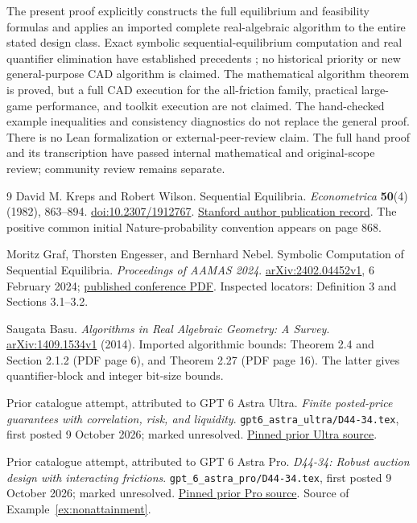 \documentclass[11pt,a4paper]{article}
\numberwithin{equation}{section}
\theoremstyle{definition}
\begin{document}
The present proof explicitly constructs the full equilibrium and
feasibility formulas and applies an imported complete real-algebraic
algorithm to the entire stated design class.
Exact symbolic sequential-equilibrium computation and real quantifier
elimination have established precedents
\cite{KW1982,GEN2024,Basu2014}; no historical priority or new
general-purpose CAD algorithm is claimed.
The mathematical algorithm theorem is proved, but a full CAD execution
for the all-friction family, practical large-game performance, and
toolkit execution are not claimed.
The hand-checked example inequalities and consistency diagnostics do
not replace the general proof.
There is no Lean formalization or external-peer-review claim.
The full hand proof and its transcription have passed internal mathematical
and original-scope review; community review remains separate.

\begin{thebibliography}{9}
David M. Kreps and Robert Wilson.
\newblock Sequential Equilibria.
\newblock \emph{Econometrica} \textbf{50}(4) (1982), 863--894.
\newblock \href{https://doi.org/10.2307/1912767}{doi:10.2307/1912767}.
\newblock \href{https://www.gsb.stanford.edu/faculty-research/publications/sequential-equilibrium}
{Stanford author publication record}.
\newblock The positive common initial Nature-probability convention
appears on page 868.

Moritz Graf, Thorsten Engesser, and Bernhard Nebel.
\newblock Symbolic Computation of Sequential Equilibria.
\newblock \emph{Proceedings of AAMAS 2024}.
\newblock \href{https://arxiv.org/html/2402.04452v1}
{arXiv:2402.04452v1}, 6 February 2024;
\href{https://www.ifaamas.org/Proceedings/aamas2024/pdfs/p715.pdf}
{published conference PDF}.
\newblock Inspected locators: Definition 3 and Sections 3.1--3.2.

Saugata Basu.
\newblock \emph{Algorithms in Real Algebraic Geometry: A Survey}.
\newblock \href{https://arxiv.org/pdf/1409.1534v1}
{arXiv:1409.1534v1} (2014).
\newblock Imported algorithmic bounds: Theorem 2.4 and
Section 2.1.2 (PDF page 6), and Theorem 2.27 (PDF page 16).
The latter gives quantifier-block and integer bit-size bounds.

Prior catalogue attempt, attributed to GPT 6 Astra Ultra.
\newblock \emph{Finite posted-price guarantees with correlation, risk,
and liquidity}.
\newblock \texttt{gpt6\_astra\_ultra/D44-34.tex},
first posted 9 October 2026; marked unresolved.
\newblock \href{https://github.com/mehmetmars7/Erdosproblems-llm-hunter/blob/00ced55ba1223fb48603e1f15028d753997ee515/attacks/open_problems/economics/gpt6_astra_ultra/D44-34.tex}
{Pinned prior Ultra source}.

Prior catalogue attempt, attributed to GPT 6 Astra Pro.
\newblock \emph{D44-34: Robust auction design with interacting frictions}.
\newblock \texttt{gpt\_6\_astra\_pro/D44-34.tex},
first posted 9 October 2026; marked unresolved.
\newblock \href{https://github.com/mehmetmars7/Erdosproblems-llm-hunter/blob/00ced55ba1223fb48603e1f15028d753997ee515/attacks/open_problems/economics/gpt_6_astra_pro/D44-34.tex}
{Pinned prior Pro source}.
Source of Example~\ref{ex:nonattainment}.
\end{thebibliography}
\end{document}
